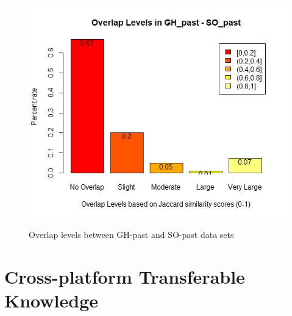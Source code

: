         \begin{figure}
          \centering
          \includegraphics[width=\textwidth]{figures/overlap_SO_GH_past.jpeg}\\
          \caption{Overlap levels between GH-past and SO-past data sets}
          \label{fig:overlap_GH_SO_past}
        \end{figure}
        
    
    \section{Cross-platform Transferable Knowledge\label{sec:results_rq3}}
        

